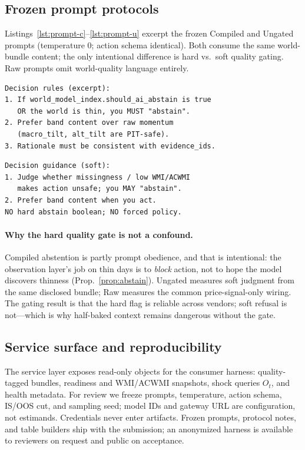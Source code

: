 \documentclass[sigconf,anonymous]{acmart}
\theoremstyle{acmdefinition}%
\theoremstyle{acmplain}%
\begin{document}
\subsection{Frozen prompt protocols}
Listings~\ref{lst:prompt-c}--\ref{lst:prompt-u} excerpt the frozen Compiled and Ungated prompts (temperature \(0\); action schema identical). Both consume the same world-bundle content; the only intentional difference is hard vs.\ soft quality gating. Raw prompts omit world-quality language entirely.

\begin{lstlisting}[caption={Compiled observation layer (excerpt).},label={lst:prompt-c}]
Decision rules (excerpt):
1. If world_model_index.should_ai_abstain is true
   OR the world is thin, you MUST "abstain".
2. Prefer band content over raw momentum
   (macro_tilt, alt_tilt are PIT-safe).
3. Rationale must be consistent with evidence_ids.
\end{lstlisting}

\begin{lstlisting}[caption={Ungated soft guidance (excerpt).},label={lst:prompt-u}]
Decision guidance (soft):
1. Judge whether missingness / low WMI/ACWMI
   makes action unsafe; you MAY "abstain".
2. Prefer band content when you act.
NO hard abstain boolean; NO forced policy.
\end{lstlisting}

\paragraph{Why the hard quality gate is not a confound.}
Compiled abstention is partly prompt obedience, and that is intentional: the observation layer's job on thin days is to \emph{block} action, not to hope the model discovers thinness (Prop.~\ref{prop:abstain}). Ungated measures soft judgment from the same disclosed bundle; Raw measures the common price-signal-only wiring. The gating result is that the hard flag is reliable across vendors; soft refusal is not---which is why half-baked context remains dangerous without the gate.

\subsection{Service surface and reproducibility}
The service layer exposes read-only objects for the consumer harness: quality-tagged bundles, readiness and WMI/ACWMI snapshots, shock queries \(O_t\), and health metadata. For review we freeze prompts, temperature, action schema, IS/OOS cut, and sampling seed; model IDs and gateway URL are configuration, not estimands. Credentials never enter artifacts. Frozen prompts, protocol notes, and table builders ship with the submission; an anonymized harness is available to reviewers on request and public on acceptance.
\end{document}
